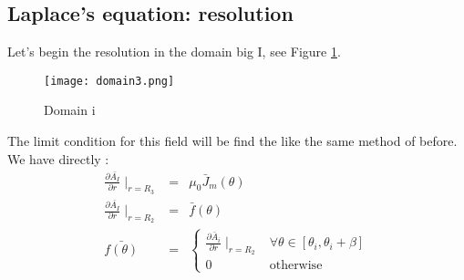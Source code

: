 \subsection{Laplace's equation: resolution}
Let's begin the resolution in the domain big I, see Figure \ref{fig:domain3}.
\begin{figure}[H]
    \centering
    \texttt{[image: domain3.png]}
    \caption{Domain i}   
    \label{fig:domain3}
\end{figure}
The limit condition for this field will be find the like the same method of before. We have directly : 
\begin{eqnarray}
\frac{\partial\bar{A_I}}{\partial r}{\mid_{r = R_3}} &=& \mu_0 \bar{J}_m(\theta)\\
\frac{\partial\bar{A_I}}{\partial r}{\mid_{r = R_2}} &=& \bar{f}(\theta)\\
    \bar{f(\theta)}&=& 
\begin{cases}
    \frac{\partial \bar{A}_i}{\partial r}\mid_{r = R_2} &  \forall \theta \in [\theta_i,\theta_i+\beta]\\
    0               & \text{otherwise}
\end{cases}
\end{eqnarray}

